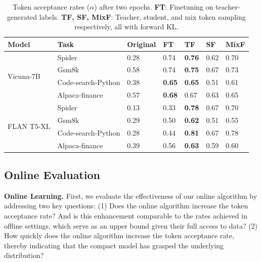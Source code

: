 \begin{table}
\begin{small}
\caption{Token acceptance rates ($\alpha$) after two epochs. 
{\bf FT}: Finetuning on teacher-generated labels. 
{\bf TF, SF, MixF}: Teacher, student, and mix token sampling respectively, all with forward KL. %
}
\label{tab:apha}
\begin{center}
\begin{tabular}{lllllll}
\toprule
{\bf Model}                 & {\bf Task}         &{\bf Original} & {\bf FT} & {\bf TF }   & {\bf SF }    & {\bf MixF}\\
\midrule
\multirow{4}{*}{Vicuna-7B}  & Spider             &  0.28    & 0.74     & {\bf 0.76}         & 0.62         & 0.70  \\
                            & Gsm8k              &  0.58    & 0.74     & {\bf 0.75}         & 0.67         & 0.73  \\
                            & Code-search-Python &  0.38    & {\bf 0.65}     & {\bf 0.65}         & 0.51         & 0.61  \\
                            & Alpaca-finance     &  0.57    & {\bf 0.68}     & 0.67         & 0.63         & 0.65  \\
\hline
\multirow{4}{*}{FLAN T5-XL} & Spider  &    0.13  &  0.33  & \textbf{0.78}         &      0.67    &  0.70 \\
                            & Gsm8k              &  0.29    &  0.50    & \textbf{0.62}         &   0.51      & 0.55  \\
                            & Code-search-Python &  0.28   &  0.44   & \textbf{0.81}         &    0.67      & 0.78 \\              
                            & Alpaca-finance     &   0.39   &  0.56   & \textbf{0.63}         &    0.59      & 0.60  \\
\bottomrule
\end{tabular}
\end{center}
\end{small}
\vspace{-20pt}
\end{table}


\subsection{Online Evaluation}
\label{sec:eval:online_evaluation}
{\bf Online Learning.} First, we evaluate the effectiveness of our online algorithm by addressing two key questions: (1) Does the online algorithm increase the token acceptance rate? And is this enhancement comparable to the rates achieved in offline settings, which serve as an upper bound given their full access to data? (2) How quickly does the online algorithm increase the token acceptance rate, thereby indicating that the compact model has grasped the underlying distribution?


